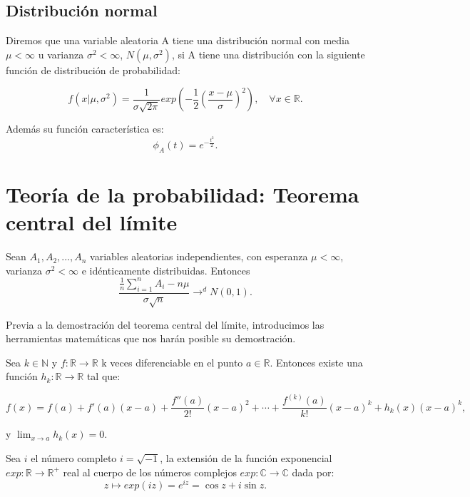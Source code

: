 \documentclass[../proyecto.tex]{memoir}
\begin{document}
\subsection{Distribución normal}

\begin{defi}
Diremos que una variable aleatoria A tiene una distribución normal con media $\mu < \infty$ u varianza $\sigma^2 < \infty$, $N(\mu,\sigma^2)$, si A tiene una distribución con la siguiente función de distribución de probabilidad: 

$$
f(x| \mu, \sigma^2) = \frac{1}{ \sigma \sqrt{ 2 \pi }} exp \left( -\frac{1}{2}\left( \frac{x-\mu}{\sigma} \right)^2 \right),\quad \forall x \in \mathds{R}.
$$

Además su función característica es: $$
 \phi_{A}(t)=e^{-\frac{t^2}{2}}.
$$
\end{defi}

\section{Teoría de la probabilidad: Teorema central del límite}

\begin{teorema}
Sean $A_{1},A_{2},...,A_{n}$ variables aleatorias independientes, con esperanza $\mu < \infty$, varianza $\sigma^2 < \infty$ e idénticamente distribuidas. Entonces $$
\frac{ \frac{1}{n}\sum_{i=1}^nA_i - n\mu}{ \sigma \sqrt{n}} \to^d N(0,1).
$$


\end{teorema}

Previa a la demostración del teorema central del límite, introducimos las herramientas matemáticas que nos harán posible su demostración.

\begin{teorema}

Sea $k \in \mathds{N}$ y $f: \mathds{R} \to \mathds{R}$ k veces diferenciable en el punto $a \in \mathds{R}$. Entonces existe una función $h_k: \mathds{R} \to \mathds{R}$ tal que:

$$
f(x)=f(a)+f'(a)(x-a)+\frac{f''(a)}{2!}(x-a)^2+\dotsb+\frac{f^{(k)}(a)}{k!}(x-a)^k + h_k(x)(x-a)^k,
$$

y $\lim_{x\to a} h_k(x) = 0$.
\end{teorema}

\begin{defi}
Sea $i$ el número completo $i=\sqrt{-1}$, la extensión de la función exponencial $exp: \mathds{R} \to \mathds{R^{+}}$ real al cuerpo de los números complejos $exp: \mathds{C} \to \mathds{C}$ dada por:
$$
z \mapsto exp(iz) = e^{iz}=\cos z+i\sin z.
$$
\end{defi}
\end{document}
